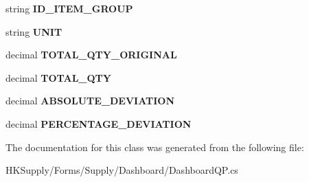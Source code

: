 \begin{DoxyCompactItemize}
string {\bfseries I\+D\+\_\+\+I\+T\+E\+M\+\_\+\+G\+R\+O\+UP}
\item 
\mbox{\label{class_h_k_supply_1_1_forms_1_1_supply_1_1_dashboard_1_1_aux_dashboard_q_p_stored_procedure_ad8a0b35cfe614a54bcbde3fdecec9293}} 
string {\bfseries U\+N\+IT}
\item 
\mbox{\label{class_h_k_supply_1_1_forms_1_1_supply_1_1_dashboard_1_1_aux_dashboard_q_p_stored_procedure_a0ca1bb9f86f948ac9d9818736b1c8a90}} 
decimal {\bfseries T\+O\+T\+A\+L\+\_\+\+Q\+T\+Y\+\_\+\+O\+R\+I\+G\+I\+N\+AL}
\item 
\mbox{\label{class_h_k_supply_1_1_forms_1_1_supply_1_1_dashboard_1_1_aux_dashboard_q_p_stored_procedure_a0c4e2241accd4ca53dc65064f32c3fcc}} 
decimal {\bfseries T\+O\+T\+A\+L\+\_\+\+Q\+TY}
\item 
\mbox{\label{class_h_k_supply_1_1_forms_1_1_supply_1_1_dashboard_1_1_aux_dashboard_q_p_stored_procedure_a1780e1741b239124ae64f96421af7990}} 
decimal {\bfseries A\+B\+S\+O\+L\+U\+T\+E\+\_\+\+D\+E\+V\+I\+A\+T\+I\+ON}
\item 
\mbox{\label{class_h_k_supply_1_1_forms_1_1_supply_1_1_dashboard_1_1_aux_dashboard_q_p_stored_procedure_a480895d3b22731429210d1438ba038f2}} 
decimal {\bfseries P\+E\+R\+C\+E\+N\+T\+A\+G\+E\+\_\+\+D\+E\+V\+I\+A\+T\+I\+ON}
\end{DoxyCompactItemize}


The documentation for this class was generated from the following file\+:\begin{DoxyCompactItemize}
\item 
H\+K\+Supply/\+Forms/\+Supply/\+Dashboard/Dashboard\+Q\+P.\+cs\end{DoxyCompactItemize}
